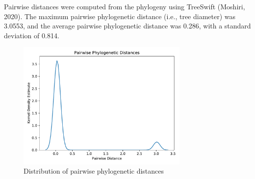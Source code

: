 \documentclass{article}
\begin{document}
Pairwise distances were computed from the phylogeny using TreeSwift (Moshiri, 2020). The maximum pairwise phylogenetic distance (i.e., tree diameter) was 3.0553, and the average pairwise phylogenetic distance was 0.286, with a standard deviation of 0.814.

\begin{figure}[h]
\centering
\includegraphics[width=0.75\textwidth,keepaspectratio]{./figs/pairwise_distances_tree.pdf}
\caption{Distribution of pairwise phylogenetic distances}
\end{figure}
\end{document}

